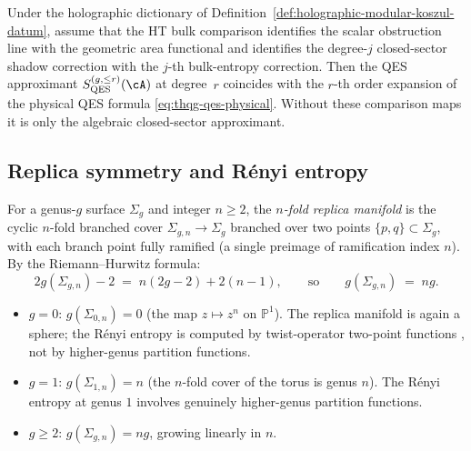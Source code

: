 \begin{conjecture}
\ClaimStatusConjectured
\label{conj:thqg-qes-identification}
Under the holographic dictionary of
Definition~\textup{\ref{def:holographic-modular-koszul-datum}},
assume that the HT bulk comparison identifies the scalar obstruction
line with the geometric area functional and identifies the
degree-$j$ closed-sector shadow correction with the $j$-th
bulk-entropy correction.  Then the QES approximant
$S_{\mathrm{QES}}^{(g,\le r)}(\cA)$ at degree~$r$ coincides with the
$r$-th order expansion of the physical QES formula
\eqref{eq:thqg-qes-physical}.  Without these comparison maps it is
only the algebraic closed-sector approximant.
\end{conjecture}

%
%

\subsection{Replica symmetry and R\'enyi entropy}
\label{subsec:thqg-entanglement-replica}

\begin{construction}
\label{constr:thqg-replica-manifold}
For a genus-$g$ surface $\Sigma_g$ and integer $n \ge 2$,
the \emph{$n$-fold replica manifold} is the cyclic $n$-fold
branched cover
$\Sigma_{g,n} \to \Sigma_g$
branched over two points $\{p, q\} \subset \Sigma_g$,
with each branch point fully ramified
\textup{(}a single preimage of ramification index $n$\textup{)}.
By the Riemann--Hurwitz formula:
\begin{equation}\label{eq:thqg-replica-genus}
2g(\Sigma_{g,n}) - 2
\;=\; n(2g - 2) + 2(n-1),
\qquad\text{so}\qquad
g(\Sigma_{g,n}) \;=\; ng.
\end{equation}
\begin{itemize}
\item $g = 0$: $g(\Sigma_{0,n}) = 0$
 \textup{(}the map $z \mapsto z^n$ on $\mathbb{P}^1$\textup{)}.
 The replica manifold is again a sphere; the R\'enyi entropy
 is computed by twist-operator two-point functions
 \cite{Calabrese-Cardy04}, not by higher-genus partition functions.

\item $g = 1$: $g(\Sigma_{1,n}) = n$
 \textup{(}the $n$-fold cover of the torus is genus $n$\textup{)}.
 The R\'enyi entropy at genus $1$ involves genuinely higher-genus
 partition functions.

\item $g \ge 2$: $g(\Sigma_{g,n}) = ng$, growing linearly in $n$.
\end{itemize}
\end{construction}

